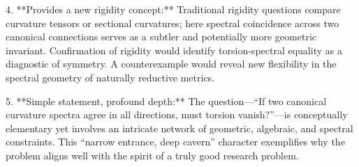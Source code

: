 4. **Provides a new rigidity concept:**  
   Traditional rigidity questions compare curvature tensors or sectional curvatures; here spectral coincidence across two canonical connections serves as a subtler and potentially more geometric invariant. Confirmation of rigidity would identify torsion-spectral equality as a diagnostic of symmetry. A counterexample would reveal new flexibility in the spectral geometry of naturally reductive metrics.

5. **Simple statement, profound depth:**  
   The question—“If two canonical curvature spectra agree in all directions, must torsion vanish?”—is conceptually elementary yet involves an intricate network of geometric, algebraic, and spectral constraints. This “narrow entrance, deep cavern” character exemplifies why the problem aligns well with the spirit of a truly good research problem.